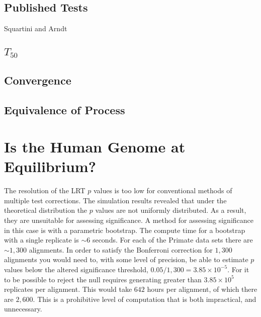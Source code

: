 

\subsection{Published Tests}
Squartini and Arndt 


% 

\subsection{$T_{50}$}

% 

% 

\subsection{Convergence}

% 

\subsection{Equivalence of Process}

\section{Is the Human Genome at Equilibrium?}

The resolution of the LRT $p$ values is too low for conventional methods of multiple test corrections. The simulation results revealed that under the theoretical distribution the $p$ values are not uniformly distributed. As a result, they are unsuitable for assessing significance. A method for assessing significance in this case is with a parametric bootstrap. The compute time for a bootstrap with a single replicate is ${\sim} 6$ seconds. For each of the Primate data sets there are ${\sim} 1,300$ alignments. In order to satisfy the Bonferroni correction for $1,300$ alignments you would need to, with some level of precision, be able to estimate $p$ values below the altered significance threshold, $0.05/1,300 = 3.85{\times}10^{-5}$. For it to be possible to reject the null requires generating greater than $3.85{\times}10^{5}$ replicates per alignment. This would take $642$ hours per alignment, of which there are $2,600$. This is a prohibitive level of computation that is both impractical, and unnecessary. 

